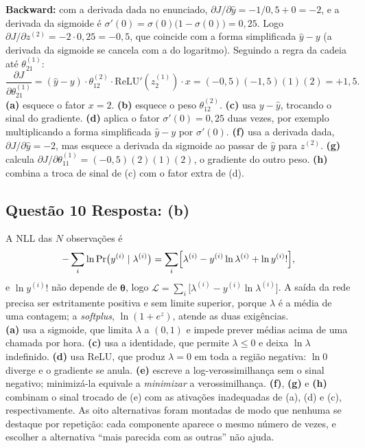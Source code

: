 \documentclass[11pt,a4paper]{article}
\begin{document}
\textbf{Backward:} com a derivada dada no enunciado, $\partial J/\partial \hat{y} = -1/0{,}5 + 0 = -2$, e a derivada da sigmoide é $\sigma'(0) = \sigma(0)\bigl(1 - \sigma(0)\bigr) = 0{,}25$. Logo $\partial J/\partial z^{(2)} = -2 \cdot 0{,}25 = -0{,}5$, que coincide com a forma simplificada $\hat{y} - y$ (a derivada da sigmoide se cancela com a do logaritmo). Seguindo a regra da cadeia até $\theta^{(1)}_{21}$:
\[
\frac{\partial J}{\partial \theta^{(1)}_{21}}
= (\hat{y} - y)\cdot \theta^{(2)}_{12} \cdot \mathrm{ReLU}'(z^{(1)}_2) \cdot x
= (-0{,}5)(-1{,}5)(1)(2) = +1{,}5 .
\]
\textbf{(a)} esquece o fator $x = 2$.
\textbf{(b)} esquece o peso $\theta^{(2)}_{12}$.
\textbf{(c)} usa $y - \hat{y}$, trocando o sinal do gradiente.
\textbf{(d)} aplica o fator $\sigma'(0) = 0{,}25$ duas vezes, por exemplo multiplicando a forma simplificada $\hat{y} - y$ por $\sigma'(0)$.
\textbf{(f)} usa a derivada dada, $\partial J/\partial \hat{y} = -2$, mas esquece a derivada da sigmoide ao passar de $\hat{y}$ para $z^{(2)}$.
\textbf{(g)} calcula $\partial J/\partial \theta^{(1)}_{11} = (-0{,}5)(2)(1)(2)$, o gradiente do outro peso.
\textbf{(h)} combina a troca de sinal de (c) com o fator extra de (d).

\subsection*{Questão 10 \textemdash{} Resposta: (b)}
A NLL das $N$ observações é
\[
-\sum_{i}\ln\Pr\bigl(y^{(i)} \mid \lambda^{(i)}\bigr) = \sum_{i}\Bigl[\lambda^{(i)} - y^{(i)}\ln\lambda^{(i)} + \ln y^{(i)}!\Bigr],
\]
e $\ln y^{(i)}!$ não depende de $\boldsymbol{\theta}$, logo $\mathcal{L} = \sum_i\bigl[\lambda^{(i)} - y^{(i)}\ln\lambda^{(i)}\bigr]$. A saída da rede precisa ser estritamente positiva e sem limite superior, porque $\lambda$ é a média de uma contagem; a \textit{softplus}, $\ln(1 + e^{z})$, atende as duas exigências.\\
\textbf{(a)} usa a sigmoide, que limita $\lambda$ a $(0, 1)$ e impede prever médias acima de uma chamada por hora.
\textbf{(c)} usa a identidade, que permite $\lambda \leq 0$ e deixa $\ln\lambda$ indefinido.
\textbf{(d)} usa ReLU, que produz $\lambda = 0$ em toda a região negativa: $\ln 0$ diverge e o gradiente se anula.
\textbf{(e)} escreve a log-verossimilhança sem o sinal negativo; minimizá-la equivale a \emph{minimizar} a verossimilhança.
\textbf{(f)}, \textbf{(g)} e \textbf{(h)} combinam o sinal trocado de (e) com as ativações inadequadas de (a), (d) e (c), respectivamente.
As oito alternativas foram montadas de modo que nenhuma se destaque por repetição: cada componente aparece o mesmo número de vezes, e escolher a alternativa ``mais parecida com as outras'' não ajuda.
\end{document}
